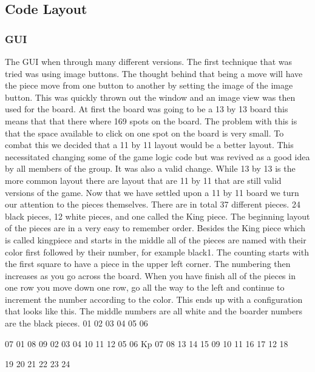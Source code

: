 \documentclass{article}
\begin{document}
\subsection{Code Layout}

\subsubsection{GUI}
	The GUI when through many different versions. The first technique that was tried was using image buttons. The thought behind that being a move will have the piece move from one button to another by setting the image of the image button. This was quickly thrown out the window and an image view was then used for the board. At first the board was going to be a 13 by 13 board this means that that there where 169 spots on the board. The problem with this is that the space available to click on one spot on the board is very small. To combat this we decided that a 11 by 11 layout would be a better layout. This necessitated changing some of the game logic code but was revived as a good idea by all members of the group. It was also a valid change. While 13 by 13 is the more common layout there are layout that are 11 by 11 that are still valid versions of the game. 
	Now that we have settled upon a 11 by 11 board we turn our attention to the pieces themselves. There are in total 37 different pieces. 24 black pieces, 12 white pieces, and one called the King piece.  The beginning layout of the pieces are in a very easy to remember order. Besides the King piece which is called kingpiece and starts in the middle all of the pieces are named with their color first followed by their number, for example black1. The counting starts with the first square to have a piece in the upper left corner. The numbering then increases as you go across the board. When you have finish all of the pieces in one row you move down one row, go all the way to the left and continue to increment the number according to the color. This ends up with a configuration that looks like this. The middle numbers are all white and the boarder numbers are the black pieces.
        01 02 03 04 05
              06
      
07            01            08
09         02 03 04         10
11 12   05 06 Kp 07 08   13 14
15         09 10 11         16
17            12            18

              19
        20 21 22 23 24
\end{document}
